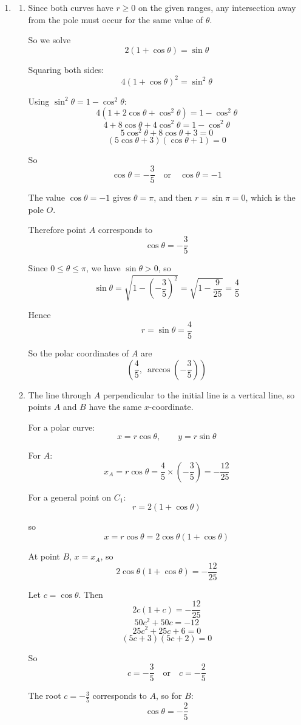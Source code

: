 \documentclass[leqno]{article}
\begin{document}
\begin{enumerate}[
  label=\textbf{\arabic*.},
  leftmargin=*,
  topsep=0pt,
  partopsep=0pt,
  parsep=0pt
]
\begin{djsSolution}
\begin{enumerate}[label=\textbf{(\alph*)}]
  \item
\begin{enumerate}[label=(\roman*)]
\item Since both curves have \(r\ge 0\) on the given ranges, any intersection away from the pole must occur for the same value of \(\theta\).

So we solve
\[
2(1+\cos\theta)=\sin\theta
\]

Squaring both sides:
\[
4(1+\cos\theta)^2=\sin^2\theta
\]

Using \(\sin^2\theta=1-\cos^2\theta\):
\[
4(1+2\cos\theta+\cos^2\theta)=1-\cos^2\theta
\]
\[
4+8\cos\theta+4\cos^2\theta=1-\cos^2\theta
\]
\[
5\cos^2\theta+8\cos\theta+3=0
\]
\[
(5\cos\theta+3)(\cos\theta+1)=0
\]

So
\[
\cos\theta=-\frac35 \quad \text{or} \quad \cos\theta=-1
\]

The value \(\cos\theta=-1\) gives \(\theta=\pi\), and then \(r=\sin\pi=0\), which is the pole \(O\).

Therefore point \(A\) corresponds to
\[
\cos\theta=-\frac35
\]

Since \(0\le \theta\le \pi\), we have \(\sin\theta>0\), so
\[
\sin\theta=\sqrt{1-\left(-\frac35\right)^2}=\sqrt{1-\frac{9}{25}}=\frac45
\]

Hence
\[
r=\sin\theta=\frac45
\]

So the polar coordinates of \(A\) are
\[
\left(\frac45,\ \arccos\left(-\frac35\right)\right)
\]

\item The line through \(A\) perpendicular to the initial line is a vertical line, so points \(A\) and \(B\) have the same \(x\)-coordinate.

For a polar curve:
\[
x=r\cos\theta,\qquad y=r\sin\theta
\]

For \(A\):
\[
x_A=r\cos\theta=\frac45\times\left(-\frac35\right)=-\frac{12}{25}
\]

For a general point on \(C_1\):
\[
r=2(1+\cos\theta)
\]

so
\[
x=r\cos\theta=2\cos\theta(1+\cos\theta)
\]

At point \(B\), \(x=x_A\), so
\[
2\cos\theta(1+\cos\theta)=-\frac{12}{25}
\]

Let \(c=\cos\theta\). Then
\[
2c(1+c)=-\frac{12}{25}
\]
\[
50c^2+50c=-12
\]
\[
25c^2+25c+6=0
\]
\[
(5c+3)(5c+2)=0
\]

So
\[
c=-\frac35 \quad \text{or} \quad c=-\frac25
\]

The root \(c=-\frac35\) corresponds to \(A\), so for \(B\):
\[
\cos\theta=-\frac25
\]


\end{enumerate}
\end{enumerate}
\end{djsSolution}
\end{enumerate}
\end{document}
